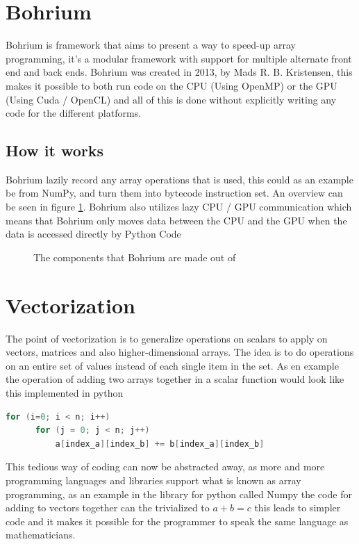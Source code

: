 \documentclass[12pt]{report}
\begin{document}
\section{Bohrium}
\label{subsec:Bohrium}
Bohrium is framework that aims to present a way to speed-up array programming, it's a modular framework with support for multiple alternate front end and back ends. Bohrium was created in 2013, by Mads R. B. Kristensen, this makes it possible to both run code on the CPU (Using OpenMP) or the GPU (Using Cuda / OpenCL) and all of this is done without explicitly writing any code for the different platforms.

\subsection{How it works}
\label{subsec:hiw}
Bohrium lazily record any array operations that is used, this could as an example be from NumPy, and turn them into bytecode instruction set. An overview can be seen in figure \ref{fig:bohrium_overview}. Bohrium also utilizes lazy CPU / GPU communication which means that Bohrium only moves data between the CPU and the GPU when the data is accessed directly by Python Code \cite{bohrium_website}

\begin{figure}[H]
  \centering
  
\caption{\label{fig:bohrium_overview}The components that Bohrium are made out of}
\end{figure}



\section{Vectorization}
\label{subsec:vectorization}

The point of vectorization is to generalize operations on scalars to apply on vectors, matrices and also higher-dimensional arrays. The idea is to do operations on an entire set of values instead of each single item in the set. As en example the operation of adding two arrays together in a scalar function would look like this implemented in python
\begin{lstlisting}[language=C]
  for (i=0; i < n; i++)
      for (j = 0; j < n; j++)
          a[index_a][index_b] += b[index_a][index_b]
\end{lstlisting}

This tedious way of coding can now be abstracted away, as more and more programming languages and libraries support what is known as array programming, as an example in the library for python called Numpy the code for adding to vectors together can the trivialized to $a + b = c$ this leads to simpler code and it makes it possible for the programmer to speak the same language as mathematicians.
\end{document}
